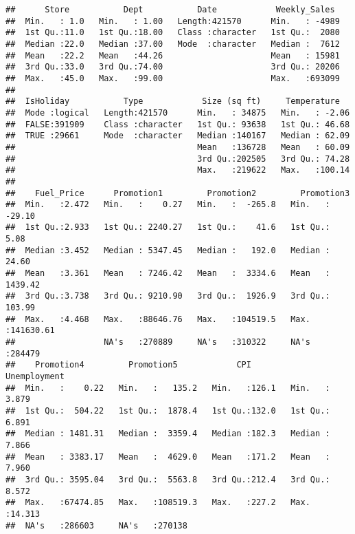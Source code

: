 \documentclass[11pt,]{article}
\newenvironment{Shaded}{\begin{snugshade}}{\end{snugshade}}
\newcommand{\KeywordTok}[1]{\textcolor[rgb]{0.13,0.29,0.53}{\textbf{{#1}}}}
\newcommand{\CommentTok}[1]{\textcolor[rgb]{0.56,0.35,0.01}{\textit{{#1}}}}
\newcommand{\NormalTok}[1]{{#1}}
\begin{document}
\begin{verbatim}
##      Store           Dept           Date            Weekly_Sales   
##  Min.   : 1.0   Min.   : 1.00   Length:421570      Min.   : -4989  
##  1st Qu.:11.0   1st Qu.:18.00   Class :character   1st Qu.:  2080  
##  Median :22.0   Median :37.00   Mode  :character   Median :  7612  
##  Mean   :22.2   Mean   :44.26                      Mean   : 15981  
##  3rd Qu.:33.0   3rd Qu.:74.00                      3rd Qu.: 20206  
##  Max.   :45.0   Max.   :99.00                      Max.   :693099  
##                                                                    
##  IsHoliday           Type            Size (sq ft)     Temperature    
##  Mode :logical   Length:421570      Min.   : 34875   Min.   : -2.06  
##  FALSE:391909    Class :character   1st Qu.: 93638   1st Qu.: 46.68  
##  TRUE :29661     Mode  :character   Median :140167   Median : 62.09  
##                                     Mean   :136728   Mean   : 60.09  
##                                     3rd Qu.:202505   3rd Qu.: 74.28  
##                                     Max.   :219622   Max.   :100.14  
##                                                                      
##    Fuel_Price      Promotion1         Promotion2         Promotion3       
##  Min.   :2.472   Min.   :    0.27   Min.   :  -265.8   Min.   :   -29.10  
##  1st Qu.:2.933   1st Qu.: 2240.27   1st Qu.:    41.6   1st Qu.:     5.08  
##  Median :3.452   Median : 5347.45   Median :   192.0   Median :    24.60  
##  Mean   :3.361   Mean   : 7246.42   Mean   :  3334.6   Mean   :  1439.42  
##  3rd Qu.:3.738   3rd Qu.: 9210.90   3rd Qu.:  1926.9   3rd Qu.:   103.99  
##  Max.   :4.468   Max.   :88646.76   Max.   :104519.5   Max.   :141630.61  
##                  NA's   :270889     NA's   :310322     NA's   :284479     
##    Promotion4         Promotion5            CPI         Unemployment   
##  Min.   :    0.22   Min.   :   135.2   Min.   :126.1   Min.   : 3.879  
##  1st Qu.:  504.22   1st Qu.:  1878.4   1st Qu.:132.0   1st Qu.: 6.891  
##  Median : 1481.31   Median :  3359.4   Median :182.3   Median : 7.866  
##  Mean   : 3383.17   Mean   :  4629.0   Mean   :171.2   Mean   : 7.960  
##  3rd Qu.: 3595.04   3rd Qu.:  5563.8   3rd Qu.:212.4   3rd Qu.: 8.572  
##  Max.   :67474.85   Max.   :108519.3   Max.   :227.2   Max.   :14.313  
##  NA's   :286603     NA's   :270138
\end{verbatim}

\begin{Shaded}
\end{Shaded}
\end{document}
